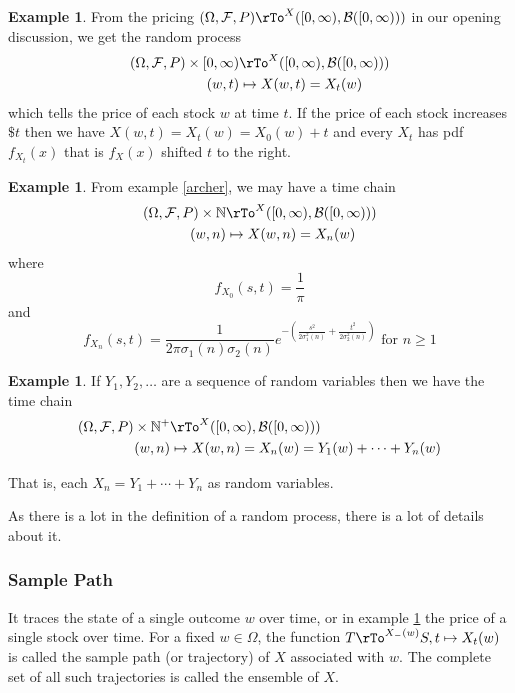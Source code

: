 \documentclass[12pt]{amsart}
\theoremstyle{definition}
\newtheorem{example}[theorem]{Example}
\begin{document}
\begin{example} \label{motivation_for_random_process_1} From the pricing $(\Omega, \mathcal{F}, P) \rTo^X ([0,\infty), \mathcal{B}([0,\infty)))$ in our opening discussion, we get the random process
\begin{align*}
(\Omega, \mathcal{F}, P) \times [0, \infty) & \rTo^X ([0,\infty), \mathcal{B}([0, \infty))) \\
(w,t) & \mapsto X(w,t) = X_t(w)
\end{align*}
which tells the price of each stock $w$ at time $t$. If the price of each stock increases $\$t$ then we have $X(w,t) = X_t(w) = X_0(w) + t$ and every $X_t$ has pdf $f_{X_t}(x)$ that is $f_X(x)$ shifted $t$ to the right.
\end{example}

\begin{example} \label{archer_1} From example \ref{archer}, we may have a time chain
\begin{align*}
(\Omega, \mathcal{F}, P) \times \mathbb{N} & \rTo^X ([0,\infty), \mathcal{B}([0,\infty))) \\
(w,n) & \mapsto X(w,n) = X_n(w)
\end{align*}
where
$$f_{X_0}(s, t) = \frac{1}{\pi}$$
and
$$f_{X_n} (s, t) = \frac{1}{2\pi\sigma_1(n)\sigma_2(n)}e^{-\left( \frac{s^2}{2\sigma_1^2(n)} + \frac{t^2}{2\sigma_2^2(n)} \right)} \text{ for } n \geq 1$$
\end{example}

\begin{example} \label{time_chain} If $Y_1, Y_2,\dots$ are a sequence of random variables then we have the time chain
\begin{align*}
(\Omega, \mathcal{F}, P) \times \mathbb{N}^+ & \rTo^X ([0,\infty), \mathcal{B}([0,\infty))) \\
(w, n) & \mapsto X(w,n)  = X_n(w) = Y_1(w) + \cdots + Y_n(w)
\end{align*}

That is, each $X_n = Y_1 + \cdots +Y_n$ as random variables.
\end{example}

As there is a lot in the definition of a random process, there is a lot of details about it.

\subsubsection{Sample Path} \label{sample_path} It traces the state of a single outcome $w$ over time, or in example \ref{motivation_for_random_process_1} the price of a single stock over time.
\dfn For a fixed $w \in \Omega$, the function $T \rTo^{X_- (w)} S, t \mapsto X_t(w)$ is called the sample path (or trajectory) of $X$ associated with $w$. The complete set of all such trajectories is called the ensemble of $X$.
\end{document}
